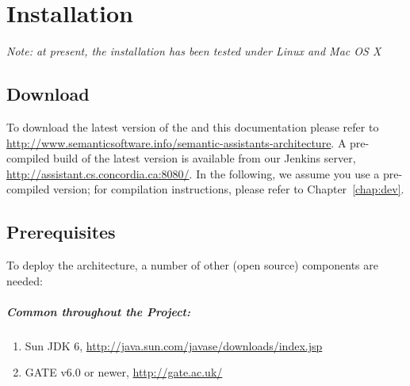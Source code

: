 

   
 

\chapter{Installation}
\label{chap:inst}
\emph{Note: at present, the installation has been tested under
  Linux and Mac OS X}

\section{Download}
To download the latest version of the \sa and this documentation
please refer to
\url{http://www.semanticsoftware.info/semantic-assistants-architecture}.
A pre-compiled build of the latest version is available from our
Jenkins server, \url{http://assistant.cs.concordia.ca:8080/}. In the
following, we assume you use a pre-compiled version; for compilation
instructions, please refer to Chapter~\ref{chap:dev}.

\section{Prerequisites}
To deploy the \sa architecture, a number of other (open source)
components are needed:

\paragraph{Common throughout the Project:}
\begin{enumerate}
  \item  Sun JDK 6, \url{http://java.sun.com/javase/downloads/index.jsp}
  \item  GATE v6.0 or newer, \url{http://gate.ac.uk/}
\end{enumerate} 

